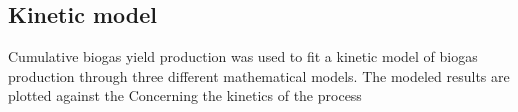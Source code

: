 \subsection{Kinetic model}
Cumulative biogas yield production  was used to fit a kinetic model of biogas production through three different mathematical models. The modeled results are plotted against the
Concerning the kinetics of the process